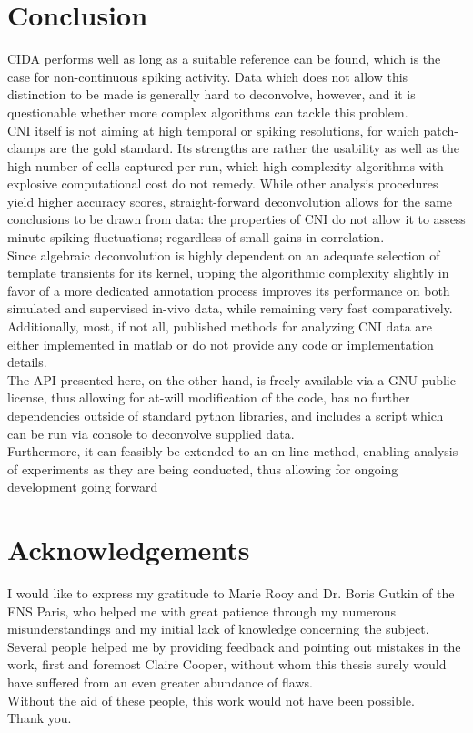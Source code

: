 \documentclass[titlepage]{article}
\begin{document}
\section{Conclusion}
CIDA performs well as long as a suitable reference can be found, which is the case for non-continuous spiking activity. Data which does not allow this distinction to be made is generally hard to deconvolve, however, and it is questionable whether more complex algorithms can tackle this problem.\\
CNI itself is not aiming at high temporal or spiking resolutions, for which patch-clamps are the gold standard\cite{yajuan_comparison_2012}. Its strengths are rather the usability as well as the high number of cells captured per run\cite{grienberger_imaging_2012},
which high-complexity algorithms with explosive computational cost do not remedy.
While other analysis procedures yield higher accuracy scores, straight-forward deconvolution allows for the same conclusions to be drawn from data: the properties of CNI do not allow it to assess minute spiking fluctuations; regardless of small gains in correlation.\\
Since algebraic deconvolution is highly dependent on an adequate selection of template transients for its kernel, upping the algorithmic complexity slightly in favor of a more dedicated annotation process improves its performance on both simulated and supervised in-vivo data, while remaining very fast comparatively.\\
Additionally, most, if not all, published methods for analyzing CNI data are either implemented in matlab or do not provide any code or implementation details\cite{ranganathan_optical_2010}\cite{sasaki_fast_2008}\cite{vogelstein_spike_2009}\cite{deneux_accurate_2016}\cite{kerr_imaging_2005}\cite{ozden_identification_2008}\cite{romano_integrated_2017}.\\
The API presented here, on the other hand, is freely available via a GNU public license, thus allowing for at-will modification of the code, has no further dependencies outside of standard python libraries, and includes a script which can be run via console to deconvolve supplied data.\\
Furthermore, it can feasibly be extended to an on-line method, enabling analysis of experiments as they are being conducted, thus allowing for ongoing development going forward
\section{Acknowledgements}
I would like to express my gratitude to Marie Rooy and Dr. Boris Gutkin of the ENS Paris, who helped me with great patience through my numerous misunderstandings and my initial lack of knowledge concerning the subject. \\
Several people helped me by providing feedback and pointing out mistakes in the work, first and foremost Claire Cooper, without whom this thesis surely would have suffered from an even greater abundance of flaws. \\
Without the aid of these people, this work would not have been possible. \\
Thank you.
\newpage

\printbibliography
\end{document}
